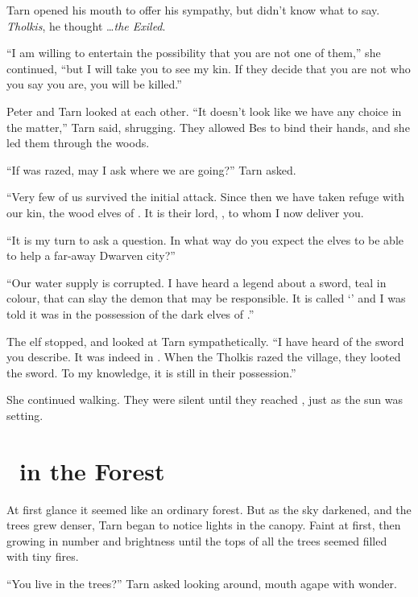 Tarn opened his mouth to offer his sympathy, but didn't know what to say.  \emph{Tholkis}, he thought \ldots \emph{the Exiled}.

``I am willing to entertain the possibility that you are not one of them,'' she continued, ``but I will take you to see my kin.  If they decide that you are not who you say you are, you will be killed.''

Peter and Tarn looked at each other.  ``It doesn't look like we have any choice in the matter,'' Tarn said, shrugging.  They allowed Bes to bind their hands, and she led them through the woods.

``If \yedmurdim was razed, may I ask where we are going?'' Tarn asked.

``Very few of us survived the initial attack.  Since then we have taken refuge with our kin, the wood elves of \inarthonor.  It is their lord, \arilor, to whom I now deliver you.

``It is my turn to ask a question.  In what way do you expect the elves to be able to help a far-away Dwarven city?''

``Our water supply is corrupted.  I have heard a legend about a sword, teal in colour, that can slay the demon that may be responsible.  It is called `\kildir' and I was told it was in the possession of the dark elves of \yedmurdim.''

The elf stopped, and looked at Tarn sympathetically.  ``I have heard of the sword you describe.  It was indeed in \yedmurdim.  When the Tholkis razed the village, they looted the sword.  To my knowledge, it is still in their possession.''

She continued walking.  They were silent until they reached \inarthonor, just as the sun was setting.

\chapter{\inarthonor\ in the Forest}

At first glance it seemed like an ordinary forest.  But as the sky darkened, and the trees grew denser, Tarn began to notice lights in the canopy.  Faint at first, then growing in number and brightness until the tops of all the trees seemed filled with tiny fires.

``You live in the trees?'' Tarn asked looking around, mouth agape with wonder.

